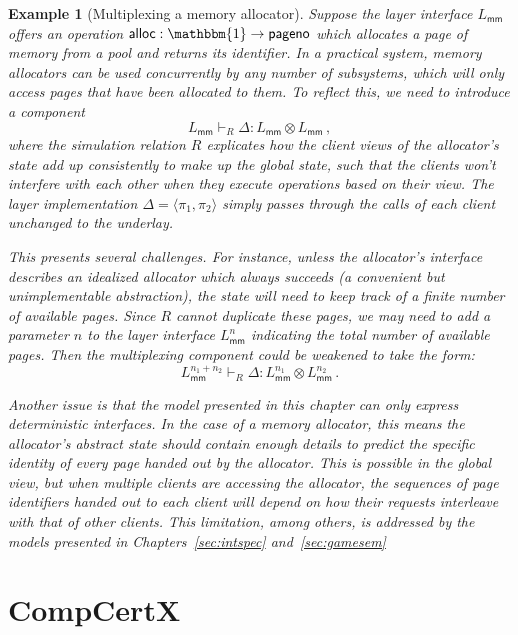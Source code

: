 \documentclass[11pt,oneside]{book}
\newtheorem{example}[theorem]{Example}
\theoremstyle{definition}
\newcommand{\kw}[1]{\ensuremath{ \mathsf{#1} }}
\begin{document}
\begin{example}[Multiplexing a memory allocator]
Suppose the layer interface $L_\kw{mm}$
offers an operation $\kw{alloc} : \mathbbm{1} \rightarrow \kw{pageno}$
which allocates a page of memory from a pool
and returns its identifier.
In a practical system,
memory allocators can be used concurrently
by any number of subsystems,
which will only access pages
that have been allocated to them.
To reflect this,
we need to introduce a component
\[
  L_\kw{mm} \vdash_R \Delta : L_\kw{mm} \otimes L_\kw{mm}
  \,,
\]
where the simulation relation $R$
explicates how the \emph{client views}
of the allocator's state
add up consistently to make up the global state,
such that the clients won't interfere with each other
when they execute operations based on their view.
The layer implementation
$\Delta = \langle \pi_1, \pi_2 \rangle$
simply passes through the calls of each client
unchanged to the underlay.

This presents several challenges.
For instance,
unless the allocator's interface
describes an idealized allocator which always succeeds
(a convenient but unimplementable abstraction),
the state will need to keep track of a finite number of
available pages.
Since $R$ cannot duplicate these pages,
we may need to add a parameter $n$ to the layer interface $L_\kw{mm}^n$
indicating the total number of available pages.
Then the multiplexing component could be weakened to
take the form:
\[
  L_\kw{mm}^{n_1 + n_2} \vdash_R \Delta : L_\kw{mm}^{n_1} \otimes L_\kw{mm}^{n_2}
  \,.
\]

Another issue is that the model presented in this chapter
can only express \emph{deterministic} interfaces.
In the case of a memory allocator,
this means the allocator's abstract state
should contain enough details to predict
the specific identity of
every page handed out by the allocator.
This is possible in the global view,
but when multiple clients are accessing the allocator,
the sequences of page identifiers handed out to each client
will depend on how their requests interleave with that of other clients.
This limitation, among others,
is addressed by the models
presented in Chapters~\ref{sec:intspec} and~\ref{sec:gamesem}
\end{example}



\section{CompCertX} \label{sec:cal:compcertx} %
\end{document}
